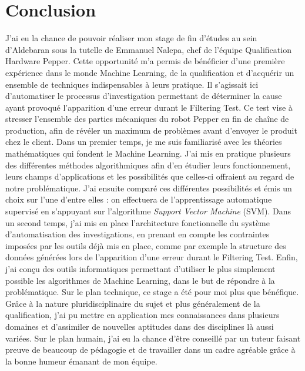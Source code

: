 \chapter{Conclusion}
\label{Conclusion}
\thispagestyle{fancy}

J'ai eu la chance de pouvoir réaliser mon stage de fin d'études au sein d'Aldebaran sous la tutelle de Emmanuel Nalepa, chef de l'équipe Qualification Hardware Pepper. Cette opportunité m'a permis de bénéficier d'une première expérience dans le monde Machine Learning, de la qualification et d'acquérir un ensemble de techniques indispensables à leurs pratique. Il s'agissait ici d'automatiser le processus d'investigation permettant de déterminer la cause ayant provoqué l'apparition d'une erreur durant le Filtering Test. Ce test vise à stresser l'ensemble des parties mécaniques du robot Pepper en fin de chaîne de production, afin de révéler un maximum de problèmes avant d'envoyer le produit chez le client.
\newline
\newline
Dans un premier temps, je me suis familiarisé avec les théories mathématiques qui fondent le Machine Learning. J'ai mis en pratique plusieurs des différentes méthodes algorithmiques afin d'en étudier leurs fonctionnement, leurs champs d'applications et les possibilités que celles-ci offraient au regard de notre problématique. J'ai ensuite comparé ces différentes possibilités et émis un choix sur l'une d'entre elles : on effectuera de l'apprentissage automatique supervisé en s'appuyant sur l'algorithme \emph{Support Vector Machine} (SVM).
\newline
Dans un second temps, j'ai mis en place l'architecture fonctionnelle du système d'automatisation des investigations, en prenant en compte les contraintes imposées par les outils déjà mis en place, comme par exemple la structure des données générées lors de l'apparition d'une erreur durant le Filtering Test. 
\newline
Enfin, j'ai conçu des outils informatiques permettant d'utiliser le plus simplement possible les algorithmes de Machine Learning, dans le but de répondre à la problématique. 
\newline
\newline
Sur le plan technique, ce stage a été pour moi plus que bénéfique. Grâce à la nature pluridisciplinaire du sujet et plus généralement de la qualification, j'ai pu mettre en application mes connaissances dans plusieurs domaines et d'assimiler de nouvelles aptitudes dans des disciplines là aussi variées. Sur le plan humain, j'ai eu la chance d’être conseillé par un tuteur faisant preuve de beaucoup de pédagogie et de travailler dans un cadre agréable grâce à la bonne humeur émanant de mon équipe.